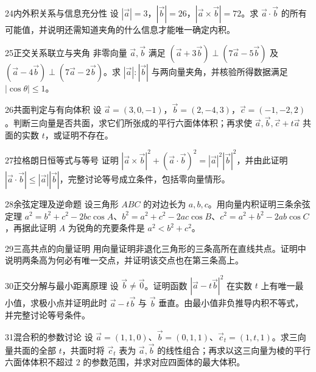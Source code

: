 \begin{exercise}{24}{内外积关系与信息充分性}
设 $|\vec a|=3$，$|\vec b|=26$，$|\vec a\times\vec b|=72$。求 $\vec a\cdot\vec b$ 的所有可能值，并说明还需知道夹角的什么信息才能唯一确定内积。
\end{exercise}
\begin{exercise}{25}{正交关系联立与夹角}
非零向量 $\vec a,\vec b$ 满足 $(\vec a+3\vec b)\perp(7\vec a-5\vec b)$ 及 $(\vec a-4\vec b)\perp(7\vec a-2\vec b)$。求 $|\vec a|:|\vec b|$ 与两向量夹角，并核验所得数据满足 $|\cos\theta|\le1$。
\end{exercise}
\begin{exercise}{26}{共面判定与有向体积}
设 $\vec a=(3,0,-1)$，$\vec b=(2,-4,3)$，$\vec c=(-1,-2,2)$。判断三向量是否共面，求它们所张成的平行六面体体积；再求使 $\vec a,\vec b,\vec c+t\vec a$ 共面的实数 $t$，或证明不存在。
\end{exercise}
\begin{exercise}{27}{拉格朗日恒等式与等号}
证明 $|\vec a\times\vec b|^2+(\vec a\cdot\vec b)^2=|\vec a|^2|\vec b|^2$，并由此证明 $|\vec a\cdot\vec b|\le |\vec a||\vec b|$，完整讨论等号成立条件，包括零向量情形。
\end{exercise}
\begin{exercise}{28}{余弦定理及逆命题}
设三角形 $ABC$ 的对边长为 $a,b,c$。用向量内积证明三条余弦定理 $a^2=b^2+c^2-2bc\cos A$、$b^2=a^2+c^2-2ac\cos B$、$c^2=a^2+b^2-2ab\cos C$，再据此证明 $A$ 为锐角的充要条件是 $a^2<b^2+c^2$。
\end{exercise}
\begin{exercise}{29}{三高共点的向量证明}
用向量证明非退化三角形的三条高所在直线共点。证明中说明两条高为何必有唯一交点，并证明该交点也在第三条高上。
\end{exercise}
\begin{exercise}{30}{正交分解与最小距离原理}
设 $\vec b\ne\vec0$。证明函数 $|\vec a-t\vec b|^2$ 在实数 $t$ 上有唯一最小值，求极小点并证明此时 $\vec a-t\vec b$ 与 $\vec b$ 垂直。由最小值非负推导内积不等式，并完整讨论等号条件。
\end{exercise}
\begin{exercise}{31}{混合积的参数讨论}
设 $\vec a=(1,1,0)$、$\vec b=(0,1,1)$、$\vec c_t=(1,t,1)$。求三向量共面的全部 $t$，共面时将 $\vec c_t$ 表为 $\vec a,\vec b$ 的线性组合；再求以这三向量为棱的平行六面体体积不超过 $2$ 的参数范围，并求对应四面体的最大体积。
\end{exercise}
